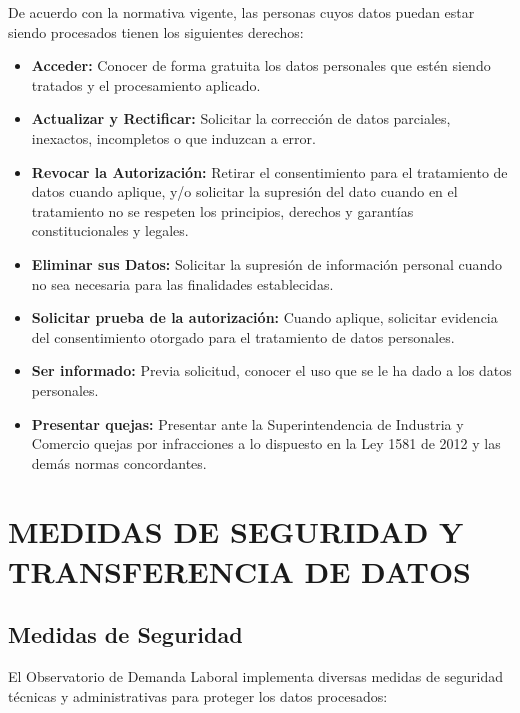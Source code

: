 \documentclass[11pt,oneside,letterpaper]{article}
\begin{document}
De acuerdo con la normativa vigente, las personas cuyos datos puedan estar siendo procesados tienen los siguientes derechos:

\begin{itemize}
    \item \textbf{Acceder:} Conocer de forma gratuita los datos personales que estén siendo tratados y el procesamiento aplicado.
    \item \textbf{Actualizar y Rectificar:} Solicitar la corrección de datos parciales, inexactos, incompletos o que induzcan a error.
    \item \textbf{Revocar la Autorización:} Retirar el consentimiento para el tratamiento de datos cuando aplique, y/o solicitar la supresión del dato cuando en el tratamiento no se respeten los principios, derechos y garantías constitucionales y legales.
    \item \textbf{Eliminar sus Datos:} Solicitar la supresión de información personal cuando no sea necesaria para las finalidades establecidas.
    \item \textbf{Solicitar prueba de la autorización:} Cuando aplique, solicitar evidencia del consentimiento otorgado para el tratamiento de datos personales.
    \item \textbf{Ser informado:} Previa solicitud, conocer el uso que se le ha dado a los datos personales.
    \item \textbf{Presentar quejas:} Presentar ante la Superintendencia de Industria y Comercio quejas por infracciones a lo dispuesto en la Ley 1581 de 2012 y las demás normas concordantes.
\end{itemize}

\newpage

\section{MEDIDAS DE SEGURIDAD Y TRANSFERENCIA DE DATOS}

\subsection{Medidas de Seguridad}

El Observatorio de Demanda Laboral implementa diversas medidas de seguridad técnicas y administrativas para proteger los datos procesados:
\end{document}
